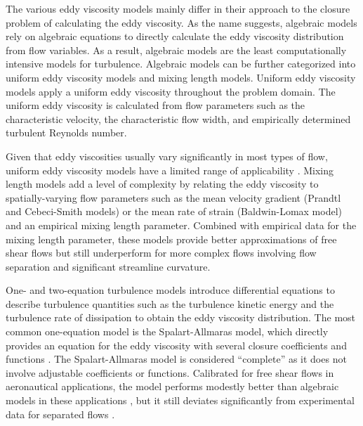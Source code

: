 The various eddy viscosity models mainly differ in their approach to
the closure problem of calculating the eddy viscosity. As the name suggests,
algebraic models rely on algebraic equations to directly calculate the eddy viscosity
distribution from flow variables. As a result, algebraic models are
the least computationally intensive models for turbulence. Algebraic models
can be further categorized into uniform eddy viscosity models
and mixing length models. Uniform eddy viscosity models apply a uniform eddy
viscosity throughout the problem domain. The uniform eddy viscosity is
calculated from flow parameters such as the characteristic velocity, the
characteristic flow width, and empirically determined turbulent Reynolds
number.

Given that eddy viscosities usually vary significantly in most types of
flow, uniform eddy viscosity models have a limited range of applicability
\cite{pope_turbulent_2000}. Mixing length models add a level of complexity by
relating the eddy viscosity to spatially-varying flow parameters such as the
mean velocity gradient (Prandtl \cite{prandtl_7_1925} and Cebeci-Smith
\cite{smith_numerical_1967} models) or the mean rate of strain (Baldwin-Lomax
\cite{baldwin_thin-layer_1978} model) and an empirical mixing length parameter.
Combined with empirical data for the mixing length parameter, these
models provide better approximations of free shear flows but still
underperform for more complex flows involving flow separation and significant streamline curvature.

One- and two-equation turbulence models introduce differential equations to
describe turbulence quantities such as the turbulence kinetic energy and the
turbulence rate of dissipation to obtain the eddy viscosity distribution. The
most common one-equation model is the Spalart-Allmaras
model, which directly provides an equation for the eddy viscosity with several
closure coefficients and functions \cite{wilcox_turbulence_2006}. The
Spalart-Allmaras model is considered ``complete'' as it does not involve
adjustable coefficients or functions. Calibrated for free shear flows in
aeronautical applications, the model performs modestly better than algebraic
models in these applications \cite{pope_turbulent_2000}, but it still deviates
significantly from experimental data
for separated flows \cite{wilcox_turbulence_2006}.

